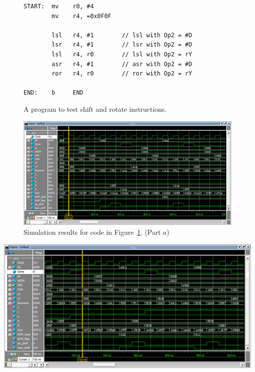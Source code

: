 \documentclass[epsfig,10pt,fullpage]{article} \addtolength{\textwidth}{1.5in}
\begin{document}
\begin{enumerate}
\lstset{language=ASM,numbers=none,escapechar=|}
\begin{figure}[H]
\begin{center}
\begin{minipage}[h]{9.5 cm}
\begin{lstlisting}[name=subr]
START:  mv    r0, #4
        mv    r4, =0x0F0F

        lsl   r4, #1        // lsl with Op2 = #D
        lsr   r4, #1        // lsr with Op2 = #D
        lsl   r4, r0        // lsl with Op2 = rY
        asr   r4, #1        // asr with Op2 = #D
        ror   r4, r0        // ror with Op2 = rY

END:    b     END
\end{lstlisting}
\end{minipage}
\caption{A program to test shift and rotate instructions.}
\label{fig:shift_code}
\end{center}
\end{figure}
\begin{minipage}[h]{15.5 cm}
\begin{figure}[H]
    \begin{center}
        \includegraphics[width = .9\textwidth]{figures/shift_a.png}
    \end{center}
    \begin{center}
        \caption{Simulation results for code in Figure~\ref{fig:shift_code}. (Part $a$)}
        \label{fig:shift}
    \end{center}
\end{figure}

\begin{center}
        \includegraphics[width = .9\textwidth]{figures/shift_b.png}
\end{center}


\end{minipage}
\end{enumerate}
\end{document}

